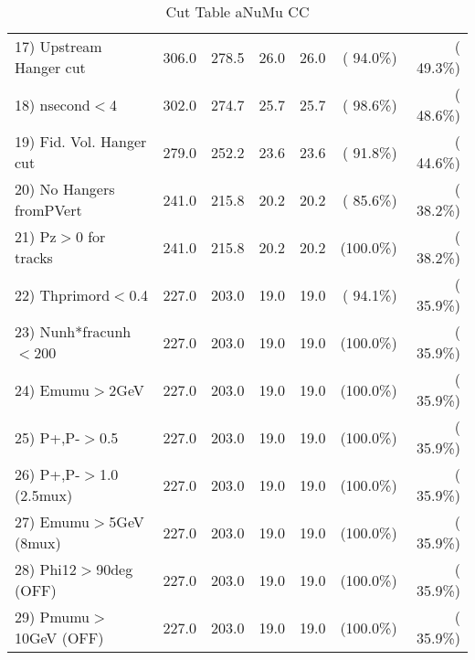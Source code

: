\begin{table}[h!]
\begin{tabular}{||l||r|r|r|r|r|r||}
 17) Upstream Hanger cut  &        306.0 &        278.5 &         26.0 &         26.0 & ( 94.0\%) & ( 49.3\%) \\
 18) nsecond$<$4          &        302.0 &        274.7 &         25.7 &         25.7 & ( 98.6\%) & ( 48.6\%) \\
 19) Fid. Vol. Hanger cut &        279.0 &        252.2 &         23.6 &         23.6 & ( 91.8\%) & ( 44.6\%) \\
 20) No Hangers fromPVert &        241.0 &        215.8 &         20.2 &         20.2 & ( 85.6\%) & ( 38.2\%) \\
 21) Pz$>$0 for tracks    &        241.0 &        215.8 &         20.2 &         20.2 & (100.0\%) & ( 38.2\%) \\
 22) Thprimord$<$0.4      &        227.0 &        203.0 &         19.0 &         19.0 & ( 94.1\%) & ( 35.9\%) \\
 23) Nunh*fracunh$<$200   &        227.0 &        203.0 &         19.0 &         19.0 & (100.0\%) & ( 35.9\%) \\
 24) Emumu$>$2GeV         &        227.0 &        203.0 &         19.0 &         19.0 & (100.0\%) & ( 35.9\%) \\
 25) P+,P-$>$0.5          &        227.0 &        203.0 &         19.0 &         19.0 & (100.0\%) & ( 35.9\%) \\
 26) P+,P-$>$1.0 (2.5mux) &        227.0 &        203.0 &         19.0 &         19.0 & (100.0\%) & ( 35.9\%) \\
 27) Emumu$>$5GeV  (8mux) &        227.0 &        203.0 &         19.0 &         19.0 & (100.0\%) & ( 35.9\%) \\
 28) Phi12$>$90deg  (OFF) &        227.0 &        203.0 &         19.0 &         19.0 & (100.0\%) & ( 35.9\%) \\
 29) Pmumu$>$10GeV  (OFF) &        227.0 &        203.0 &         19.0 &         19.0 & (100.0\%) & ( 35.9\%) \\
 \hline
 \hline
 \end{tabular}
 \caption{Cut Table  aNuMu CC }
 \label{tab-cutcohjpsi-mumu_anumucc}
 \end{table}
